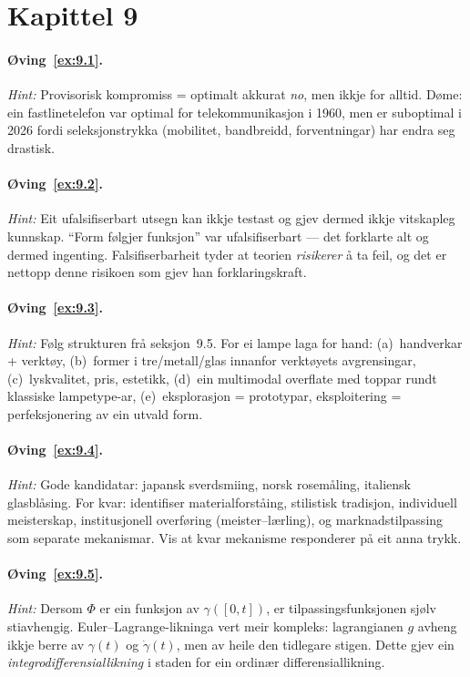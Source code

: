 \section*{Kapittel 9}

\paragraph{Øving~\ref{ex:9.1}.}
\emph{Hint:} Provisorisk kompromiss = optimalt akkurat \emph{no},
men ikkje for alltid. Døme: ein fastlinetelefon var optimal for
telekommunikasjon i 1960, men er suboptimal i 2026 fordi
seleksjonstrykka (mobilitet, bandbreidd, forventningar) har
endra seg drastisk.

\paragraph{Øving~\ref{ex:9.2}.}
\emph{Hint:} Eit ufalsifiserbart utsegn kan ikkje testast og gjev
dermed ikkje vitskapleg kunnskap. ``Form følgjer funksjon'' var
ufalsifiserbart --- det forklarte alt og dermed ingenting.
Falsifiserbarheit tyder at teorien \emph{risikerer} å ta feil,
og det er nettopp denne risikoen som gjev han forklaringskraft.

\paragraph{Øving~\ref{ex:9.3}.}
\emph{Hint:} Følg strukturen frå seksjon~9.5. For ei lampe laga
for hand: (a)~handverkar + verktøy, (b)~former i tre/metall/glas
innanfor verktøyets avgrensingar, (c)~lyskvalitet, pris, estetikk,
(d)~ein multimodal overflate med toppar rundt klassiske lampetype-ar,
(e)~eksplorasjon = prototypar, eksploitering = perfeksjonering av
ein utvald form.

\paragraph{Øving~\ref{ex:9.4}.}
\emph{Hint:} Gode kandidatar: japansk sverdsmiing, norsk
rosemåling, italiensk glasblåsing. For kvar: identifiser
materialforståing, stilistisk tradisjon, individuell meisterskap,
institusjonell overføring (meister--lærling), og marknads\-tilpassing
som separate mekanismar. Vis at kvar mekanisme responderer på eit
anna trykk.

\paragraph{Øving~\ref{ex:9.5}.}
\emph{Hint:} Dersom $\Phi$ er ein funksjon av
$\gamma([0, t])$, er tilpassingsfunksjonen sjølv stiavhengig.
Euler--Lagrange-likninga vert meir kompleks: lagrangianen $g$
avheng ikkje berre av $\gamma(t)$ og $\dot{\gamma}(t)$, men av
heile den tidlegare stigen. Dette gjev ein \emph{integrodifferensiallikning}
i staden for ein ordinær differensiallikning.


